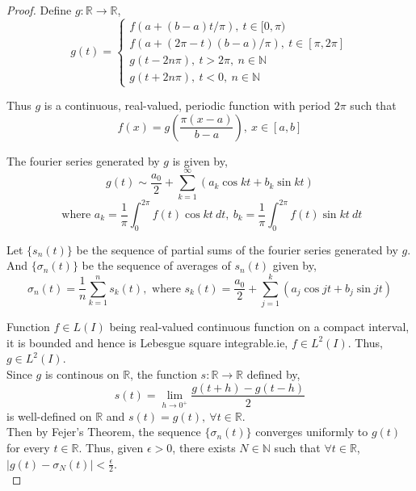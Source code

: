 	\begin{proof}
		Define $g : \mathbb{R} \to \mathbb{R}$,
		$$ g(t) = \begin{cases}
			f(a+(b-a)t/\pi),\ t \in [0,\pi) \\
			f(a+(2\pi-t)(b-a)/\pi),\ t \in [\pi,2\pi] \\
			g(t - 2n\pi),\ t > 2\pi,\ n \in \mathbb{N} \\
			g(t+2n\pi),\ t < 0,\ n \in \mathbb{N}
			\end{cases}$$

		Thus $g$ is a continuous, real-valued, periodic function with period $2\pi$ such that
		\begin{equation}
			f(x) = g\left(\frac{\pi (x-a)}{b-a}\right),\ x \in [a,b]
			\label{equ:fx}
		\end{equation}

		The fourier series generated by $g$ is given by,
		$$ g(t) \sim \frac{a_0}{2} + \sum_{k=1}^\infty \left( a_k \cos kt + b_k \sin kt \right)$$
		$$ \text{ where } a_k = \frac{1}{\pi} \int_0^{2\pi} f(t) \cos kt\ dt,\ b_k = \frac{1}{\pi} \int_0^{2\pi} f(t) \sin kt\ dt$$

		Let $\{s_n(t)\}$ be the sequence of partial sums of the fourier series generated by $g$. And $\{\sigma_n(t)\}$  be the sequence of averages of $s_n(t)$ given by,
		$$\sigma_n(t) = \frac{1}{n} \sum_{k = 1}^n s_k(t),\text{ where } s_k(t) = \frac{a_0}{2} + \sum_{j = 1}^k \left( a_j \cos jt + b_j \sin jt \right)$$

		Function $f \in L(I)$ being real-valued continuous function on a compact interval, it is bounded and hence is Lebesgue square integrable.ie, $f \in L^2(I)$. Thus, $g \in L^2(I)$.\\

		Since $g$ is continous on $\mathbb{R}$, the function $s : \mathbb{R} \to \mathbb{R}$ defined by,
		$$ s(t) = \lim_{h \to 0^+} \frac{g(t+h)-g(t-h)}{2} $$
		is well-defined on $\mathbb{R}$ and $s(t) = g(t),\ \forall t \in \mathbb{R}$.\\

		Then by Fejer's Theorem, the sequence $\{\sigma_n(t)\}$ converges uniformly to $g(t)$ for every $t \in \mathbb{R}$. Thus, given $\epsilon > 0$, there exists $N \in \mathbb{N}$ such that $\forall t \in \mathbb{R}$, $|g(t)-\sigma_N(t)| < \frac{\epsilon}{2}$.\\


\end{proof}
